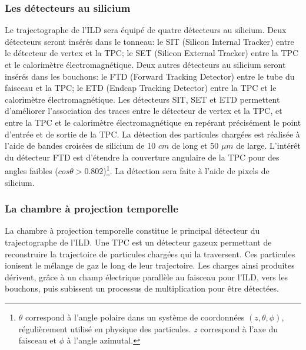 \subsubsection{Les détecteurs au silicium}
Le trajectographe de l'ILD sera équipé de quatre détecteurs au silicium. Deux détecteurs seront insérés dans le tonneau: le SIT (Silicon Internal Tracker) entre le détecteur de vertex et la TPC; le SET (Silicon External Tracker) entre la TPC et le calorimètre électromagnétique. Deux autres détecteurs au silicium seront insérés dans les bouchons: le FTD (Forward Tracking Detector) entre le tube du faisceau et la TPC; le ETD (Endcap Tracking Detector) entre la TPC et le calorimètre électromagnétique. Les détecteurs SIT, SET et ETD permettent d'améliorer l'association des traces entre le détecteur de vertex et la TPC, et entre la TPC et le calorimètre électromagnétique en repérant précisément le point d'entrée et de sortie de la TPC. La détection des particules chargées est réalisée à l'aide de bandes croisées de silicium de 10 $cm$ de long et 50 $\mu m$ de large. L'intérêt du détecteur FTD est d'étendre la couverture angulaire de la TPC pour des angles faibles ($cos\theta>0.802$)\footnote{$\theta$ correspond à l'angle polaire dans un système de coordonnées $(z,\theta,\phi)$, régulièrement utilisé en physique des particules. $z$ correspond à l'axe du faisceau et $\phi$  à l'angle azimutal.}. La détection sera faite à l'aide de pixels de silicium. 

\subsubsection{La chambre à projection temporelle}
La chambre à projection temporelle constitue le principal détecteur du trajectographe de l'ILD. Une TPC est un détecteur gazeux permettant de reconstruire la trajectoire de particules chargées qui la traversent. Ces particules ionisent le mélange de gaz le long de leur trajectoire. Les charges ainsi produites dérivent, grâce à un champ électrique parallèle au faisceau pour l'ILD, vers les bouchons, puis subissent un processus de multiplication pour être détectées. 

